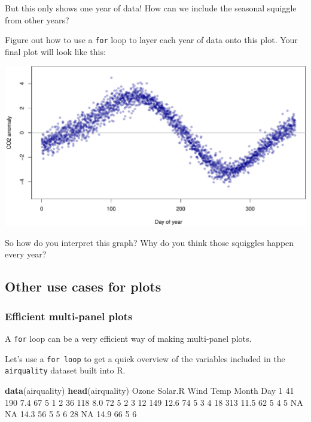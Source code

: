 \documentclass[
]{book}
\newenvironment{Shaded}{\begin{snugshade}}{\end{snugshade}}
\newcommand{\DecValTok}[1]{\textcolor[rgb]{0.00,0.00,0.81}{#1}}
\newcommand{\FloatTok}[1]{\textcolor[rgb]{0.00,0.00,0.81}{#1}}
\newcommand{\KeywordTok}[1]{\textcolor[rgb]{0.13,0.29,0.53}{\textbf{#1}}}
\newcommand{\NormalTok}[1]{#1}
\newcommand{\OtherTok}[1]{\textcolor[rgb]{0.56,0.35,0.01}{#1}}
\begin{document}
But this only shows one year of data! How can we include the seasonal squiggle from other years?

Figure out how to use a \texttt{for} loop to layer each year of data onto this plot. Your final plot will look like this:

\includegraphics{figures/unnamed-chunk-485-1.pdf}

So how do you interpret this graph? Why do you think those squiggles happen every year?

\hypertarget{other-use-cases-for-plots}{%
\subsection*{Other use cases for plots}\label{other-use-cases-for-plots}}

\hypertarget{efficient-multi-panel-plots}{%
\subsubsection*{Efficient multi-panel plots}\label{efficient-multi-panel-plots}}

A \texttt{for} loop can be a very efficient way of making multi-panel plots.

Let's use a \texttt{for\ loop} to get a quick overview of the variables included in the \texttt{airquality} dataset built into R.

\begin{Shaded}
\begin{Highlighting}[]
\KeywordTok{data}\NormalTok{(airquality)}
\KeywordTok{head}\NormalTok{(airquality)}
\NormalTok{  Ozone Solar.R Wind Temp Month Day}
\DecValTok{1}    \DecValTok{41}     \DecValTok{190}  \FloatTok{7.4}   \DecValTok{67}     \DecValTok{5}   \DecValTok{1}
\DecValTok{2}    \DecValTok{36}     \DecValTok{118}  \FloatTok{8.0}   \DecValTok{72}     \DecValTok{5}   \DecValTok{2}
\DecValTok{3}    \DecValTok{12}     \DecValTok{149} \FloatTok{12.6}   \DecValTok{74}     \DecValTok{5}   \DecValTok{3}
\DecValTok{4}    \DecValTok{18}     \DecValTok{313} \FloatTok{11.5}   \DecValTok{62}     \DecValTok{5}   \DecValTok{4}
\DecValTok{5}    \OtherTok{NA}      \OtherTok{NA} \FloatTok{14.3}   \DecValTok{56}     \DecValTok{5}   \DecValTok{5}
\DecValTok{6}    \DecValTok{28}      \OtherTok{NA} \FloatTok{14.9}   \DecValTok{66}     \DecValTok{5}   \DecValTok{6}
\end{Highlighting}
\end{Shaded}
\end{document}
